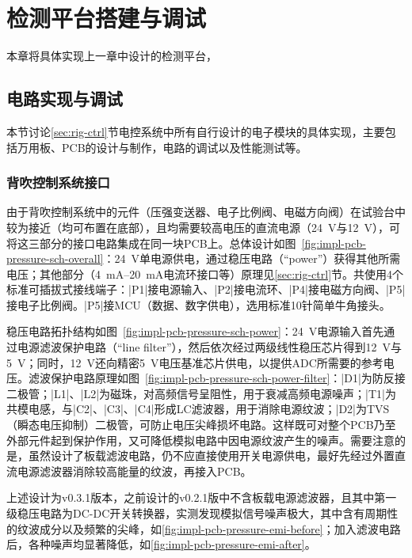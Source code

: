 \chapter{检测平台搭建与调试}\label{ch:impl}

本章将具体实现上一章中设计的检测平台，



\section{电路实现与调试}\label{sec:impl-pcb}

本节讨论\ref{sec:rig-ctrl}节电控系统中所有自行设计的电子模块的具体实现，主要包括万用板、PCB的设计与制作，电路的调试以及性能测试等。


\subsection{背吹控制系统接口}\label{sec:impl-pcb-pressure}

由于背吹控制系统中的元件（压强变送器、电子比例阀、电磁方向阀）在试验台中较为接近（均可布置在底部），且均需要较高电压的直流电源（\SI{+24}{\V}与\SI{+12}{\V}），可将这三部分的接口电路集成在同一块PCB上。总体设计如图~\ref{fig:impl-pcb-pressure-sch-overall}：\SI{+24}{\V}单电源供电，通过稳压电路（``power''）获得其他所需电压；其他部分（\SIrange{4}{20}{\mA}电流环接口等）原理见\ref{sec:rig-ctrl}节。共使用4个标准可插拔式接线端子：\bverb|P1|接电源输入、\bverb|P2|接电流环、\bverb|P4|接电磁方向阀、\bverb|P5|接电子比例阀。\bverb|P5|接MCU（数据、数字供电），选用标准10针简单牛角接头。

稳压电路拓扑结构如图~\ref{fig:impl-pcb-pressure-sch-power}：\SI{+24}{\V}电源输入首先通过电源滤波保护电路（``line filter''），然后依次经过两级线性稳压芯片得到\SI{+12}{\V}与\SI{+5}{\V}；同时，\SI{+12}{\V}还向精密\SI{+5}{\V}电压基准芯片供电，以提供ADC所需要的参考电压。滤波保护电路原理如图~\ref{fig:impl-pcb-pressure-sch-power-filter}：\bverb|D1|为防反接二极管；\bverb|L1|、\bverb|L2|为磁珠，对高频信号呈阻性，用于衰减高频电源噪声；\bverb|T1|为共模电感，与\bverb|C2|、\bverb|C3|、\bverb|C4|形成LC滤波器，用于消除电源纹波；\bverb|D2|为TVS（瞬态电压抑制）二极管，可防止电压尖峰损坏电路。这样既可对整个PCB乃至外部元件起到保护作用，又可降低模拟电路中因电源纹波产生的噪声。需要注意的是，虽然设计了板载滤波电路，仍不应直接使用开关电源供电，最好先经过外置直流电源滤波器消除较高能量的纹波，再接入PCB。

上述设计为v0.3.1版本，之前设计的v0.2.1版中不含板载电源滤波器，且其中第一级稳压电路为DC-DC开关转换器，实测发现模拟信号噪声极大，其中含有周期性的纹波成分以及频繁的尖峰，如\ref{fig:impl-pcb-pressure-emi-before}；加入滤波电路后，各种噪声均显著降低，如\ref{fig:impl-pcb-pressure-emi-after}。

